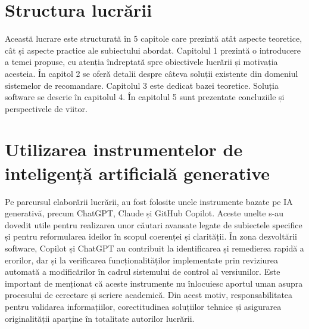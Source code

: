 \section{Structura lucrării}
\label{section:ch1sec3}

Această lucrare este structurată în 5 capitole care prezintă atât aspecte teoretice, cât și aspecte practice ale subiectului abordat. 
Capitolul 1 prezintă o introducere a temei propuse, cu atenția îndreptată spre obiectivele lucrării și motivația acesteia. 
În capitol 2 se oferă detalii despre câteva soluții existente din domeniul sistemelor de recomandare.
Capitolul 3 este dedicat bazei teoretice.
Soluția software se descrie în capitolul 4. 
În capitolul 5 sunt prezentate concluziile și perspectivele de viitor.

\section{Utilizarea instrumentelor de inteligență artificială generative}
\label{section:ch1sec4}
Pe parcursul elaborării lucrării, au fost folosite unele instrumente bazate pe IA generativă, precum ChatGPT, Claude și GitHub Copilot.
Aceste unelte s-au dovedit utile pentru realizarea unor căutari avansate legate de subiectele specifice și pentru reformularea ideilor în scopul coerenței și clarității.
În zona dezvoltării software, Copilot și ChatGPT au contribuit la identificarea și remedierea rapidă a erorilor, dar și la verificarea funcționalităților implementate prin reviziurea automată a modificărilor în cadrul sistemului de control al versiunilor.
Este important de menționat că aceste instrumente nu înlocuiesc aportul uman asupra procesului de cercetare și scriere academică.
Din acest motiv, responsabilitatea pentru validarea informațiilor, corectitudinea soluțiilor tehnice și asigurarea originalității aparține în totalitate autorilor lucrării.